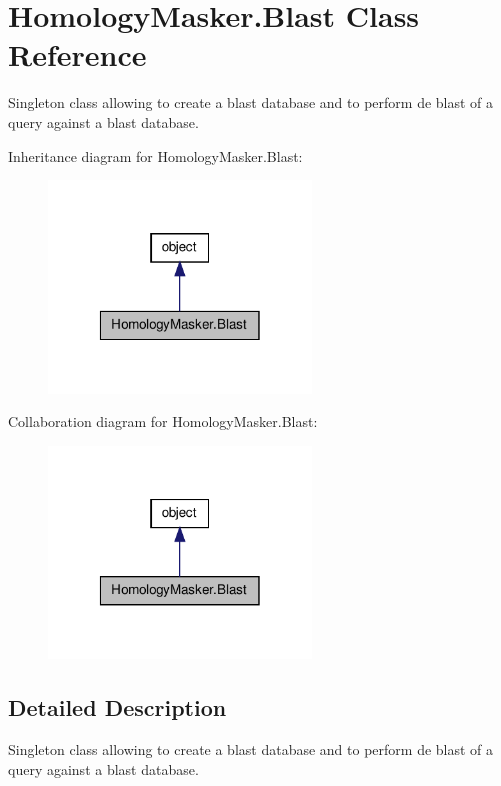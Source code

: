 \hypertarget{classHomologyMasker_1_1Blast}{\section{Homology\-Masker.\-Blast Class Reference}
\label{classHomologyMasker_1_1Blast}
}


Singleton class allowing to create a blast database and to perform de blast of a query against a blast database.  




Inheritance diagram for Homology\-Masker.\-Blast\-:
\nopagebreak
\begin{figure}[H]
\begin{center}
\leavevmode
\includegraphics[width=198pt]{classHomologyMasker_1_1Blast__inherit__graph}
\end{center}
\end{figure}


Collaboration diagram for Homology\-Masker.\-Blast\-:
\nopagebreak
\begin{figure}[H]
\begin{center}
\leavevmode
\includegraphics[width=198pt]{classHomologyMasker_1_1Blast__coll__graph}
\end{center}
\end{figure}


\subsection{Detailed Description}
Singleton class allowing to create a blast database and to perform de blast of a query against a blast database. 

